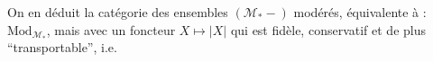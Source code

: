On en déduit la catégorie des ensembles  $(\mathcal M_*-)$ modérés, équivalente à : $\mathrm{Mod}_{\mathcal M_*}$, mais avec un foncteur
\qquad$X\longmapsto|X|$
qui est fidèle, conservatif et de plus ``transportable'', i.e.
